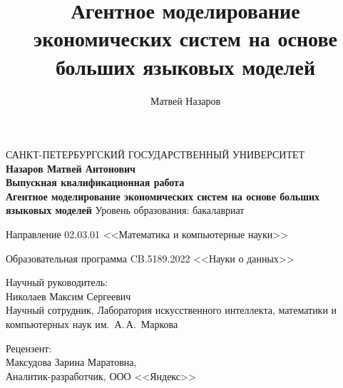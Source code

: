 \documentclass[12pt, a4paper]{article}
\title{Агентное моделирование экономических систем на основе больших языковых моделей}
\author{Матвей Назаров}
\begin{document}
\thispagestyle{empty}

\begin{center}
САНКТ-ПЕТЕРБУРГСКИЙ ГОСУДАРСТВЕННЫЙ УНИВЕРСИТЕТ\\
\vspace{1.5cm}
\textbf{\large Назаров Матвей Антонович} \\
\vspace{0.7cm}
\textbf{\large Выпускная квалификационная работа}\\
\vspace{0.7cm}
\textbf{\large Агентное моделирование экономических систем на основе больших языковых моделей}
\vfil\vfil
Уровень образования: бакалавриат

Направление 02.03.01 <<Математика и компьютерные науки>>

Образовательная программа CB.5189.2022 <<Науки о данных>>
\end{center}


\vfil\vfil
\noindent\hfill
\begin{minipage}{0.6\textwidth}
\raggedleft
Научный руководитель:\\
Николаев Максим Сергеевич\\
Научный сотрудник, Лаборатория искусственного интеллекта, математики и компьютерных наук им.~А.\,А.~Маркова

\bigskip
Рецензент:\\
Максудова Зарина Маратовна,\\
Аналитик-разработчик, ООО <<Яндекс>>
\end{minipage}
\end{document}
